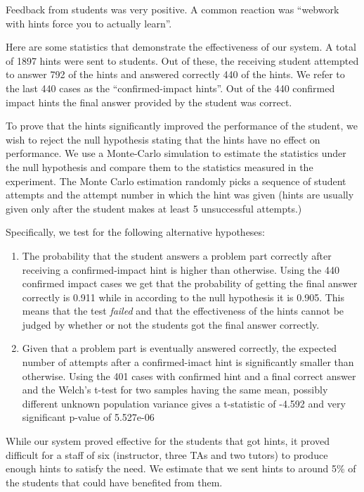 \documentclass{sigchi}
\begin{document}
Feedback from students was very positive. A common reaction was
``webwork with hints force you to actually learn''.

Here are some statistics that demonstrate the effectiveness of our
system. A total of 1897 hints were sent to students. Out of
these, the receiving student attempted to answer 792 of the hints and
answered correctly 440 of the hints. We refer to the last 440 cases as
the ``confirmed-impact hints''. Out of the 440 confirmed impact hints
the final answer provided by the student was correct.

To prove that the hints significantly improved the performance of the
student, we wish to reject the null hypothesis stating that the hints
have no effect on performance. We use a Monte-Carlo simulation to
estimate the statistics under the null hypothesis and compare them to
the statistics measured in the experiment. The Monte Carlo estimation
randomly picks a sequence of student attempts and the attempt number
in which the hint was given (hints are usually given only after the
student makes at least 5 unsuccessful attempts.)

Specifically, we test for the following alternative hypotheses:
\begin{enumerate}
\item The probability that the student answers a problem part
  correctly after receiving a confirmed-impact hint is higher than
  otherwise. Using the 440 confirmed impact cases we get that the
  probability of getting the final answer correctly is 0.911 while in
  according to the null hypothesis it is 0.905. This means that the
  test {\em failed} and that the effectiveness of the hints cannot be
  judged by whether or not the students got the final answer
  correctly.
\item Given that a problem part is eventually answered correctly, the
  expected number of attempts after a confirmed-imact hint is
  significantly smaller than otherwise. Using the 401 cases with
  confirmed hint and a final correct answer and the Welch's t-test 
  for two samples having the same mean, possibly different unknown 
  population variance gives a t-statistic of -4.592 and very
  significant p-value of 5.527e-06
\end{enumerate}

While our system proved effective for the students that got hints, it
proved difficult for a staff of six (instructor, three TAs and two
tutors) to produce enough hints to satisfy the need. We
estimate that we sent hints to around 5\% of the students that could
have benefited from them.
\end{document}
